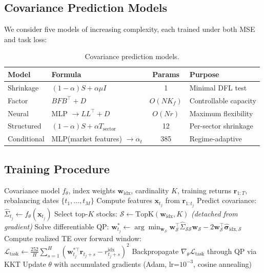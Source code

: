 \documentclass[11pt]{article}
\newcommand{\bw}{\mathbf{w}}
\newcommand{\br}{\mathbf{r}}
\newcommand{\bx}{\mathbf{x}}
\newcommand{\bSigma}{\hat{\Sigma}}
\newcommand{\bsigma}{\boldsymbol{\sigma}}
\newcommand{\cS}{\mathcal{S}}
\newcommand{\cL}{\mathcal{L}}
\begin{document}
\subsection{Covariance Prediction Models}

We consider five models of increasing complexity, each trained under both MSE and task loss:

\begin{table}[h]
\centering
\caption{Covariance prediction models.}
\label{tab:models}
\small
\begin{tabular}{@{}llcl@{}}
\toprule
\textbf{Model} & \textbf{Formula} & \textbf{Params} & \textbf{Purpose} \\
\midrule
Shrinkage & $(1{-}\alpha)S + \alpha\mu I$ & 1 & Minimal DFL test \\
Factor & $BFB^\top + D$ & $O(NK_f)$ & Controllable capacity \\
Neural & MLP $\to LL^\top + D$ & $O(Nr)$ & Maximum flexibility \\
Structured & $(1{-}\alpha)S + \alpha T_{\text{sector}}$ & 12 & Per-sector shrinkage \\
Conditional & MLP(market features) $\to \alpha_t$ & 385 & Regime-adaptive \\
\bottomrule
\end{tabular}
\end{table}

\subsection{Training Procedure}

\begin{algorithm}[t]
\caption{Task-Aware Covariance Estimation for Sparse Index Tracking}
\label{alg:dfl}
\begin{algorithmic}[1]
\REQUIRE Covariance model $f_\theta$, index weights $\bw_{\text{idx}}$, cardinality $K$, training returns $\br_{1:T}$, rebalancing dates $\{t_1, \dots, t_M\}$
    \STATE Compute features $\bx_{t_j}$ from $\br_{1:t_j}$
    \STATE Predict covariance: $\bSigma_{t_j} \leftarrow f_\theta(\bx_{t_j})$
    \STATE Select top-$K$ stocks: $\cS \leftarrow \text{TopK}(\bw_{\text{idx}}, K)$ \hfill {\footnotesize\textit{(detached from gradient)}}
    \STATE Solve differentiable QP: $\bw^*_{t_j} \leftarrow \arg\min_{\bw_\cS} \bw_\cS^\top \bSigma_{\cS\cS} \bw_\cS - 2\bw_\cS^\top \hat{\bsigma}_{\text{idx},\cS}$
    \STATE Compute realized TE over forward window: $\cL_{\text{task}} \leftarrow \frac{252}{H}\sum_{s=1}^{H}(\bw^{*\top}_{t_j} \br_{t_j+s} - r^{\text{idx}}_{t_j+s})^2$
    \STATE Backpropagate $\nabla_\theta \cL_{\text{task}}$ through QP via KKT
  \ENDFOR
  \STATE Update $\theta$ with accumulated gradients (Adam, lr=$10^{-3}$, cosine annealing)
\ENDFOR
\end{algorithmic}
\end{algorithm}
\end{document}
